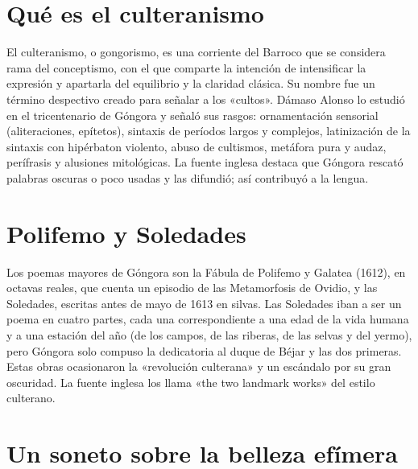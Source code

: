 \documentclass{book}
\begin{document}

\section{Qué es el culteranismo}

El culteranismo, o gongorismo, es una corriente del Barroco que se considera rama del conceptismo, con el que comparte la intención de intensificar la expresión y apartarla del equilibrio y la claridad clásica. Su nombre fue un término despectivo creado para señalar a los «cultos». Dámaso Alonso lo estudió en el tricentenario de Góngora y señaló sus rasgos: ornamentación sensorial (aliteraciones, epítetos), sintaxis de períodos largos y complejos, latinización de la sintaxis con hipérbaton violento, abuso de cultismos, metáfora pura y audaz, perífrasis y alusiones mitológicas. La fuente inglesa destaca que Góngora rescató palabras oscuras o poco usadas y las difundió; así contribuyó a la lengua.


\section{Polifemo y Soledades}

Los poemas mayores de Góngora son la Fábula de Polifemo y Galatea (1612), en octavas reales, que cuenta un episodio de las Metamorfosis de Ovidio, y las Soledades, escritas antes de mayo de 1613 en silvas. Las Soledades iban a ser un poema en cuatro partes, cada una correspondiente a una edad de la vida humana y a una estación del año (de los campos, de las riberas, de las selvas y del yermo), pero Góngora solo compuso la dedicatoria al duque de Béjar y las dos primeras. Estas obras ocasionaron la «revolución culterana» y un escándalo por su gran oscuridad. La fuente inglesa los llama «the two landmark works» del estilo culterano.


\section{Un soneto sobre la belleza efímera}
\end{document}
